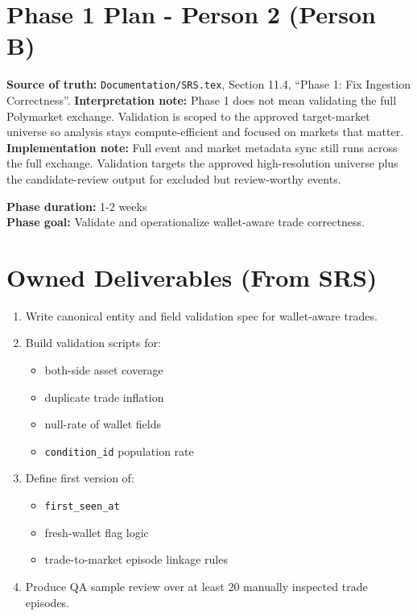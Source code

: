 \documentclass{article}
\begin{document}
\section*{Phase 1 Plan - Person 2 (Person B)}

\textbf{Source of truth:} \texttt{Documentation/SRS.tex}, Section 11.4, ``Phase 1: Fix Ingestion Correctness''.
\textbf{Interpretation note:} Phase 1 does not mean validating the full Polymarket exchange. Validation is scoped to the approved target-market universe so analysis stays compute-efficient and focused on markets that matter.
\textbf{Implementation note:} Full event and market metadata sync still runs across the full exchange. Validation targets the approved high-resolution universe plus the candidate-review output for excluded but review-worthy events.

\textbf{Phase duration:} 1-2 weeks\\
\textbf{Phase goal:} Validate and operationalize wallet-aware trade correctness.

\section*{Owned Deliverables (From SRS)}
\begin{enumerate}
\item Write canonical entity and field validation spec for wallet-aware trades.
\item Build validation scripts for:
\begin{itemize}
\item both-side asset coverage
\item duplicate trade inflation
\item null-rate of wallet fields
\item \texttt{condition\_id} population rate
\end{itemize}
\item Define first version of:
\begin{itemize}
\item \texttt{first\_seen\_at}
\item fresh-wallet flag logic
\item trade-to-market episode linkage rules
\end{itemize}
\item Produce QA sample review over at least 20 manually inspected trade episodes.
\end{enumerate}
\end{document}
